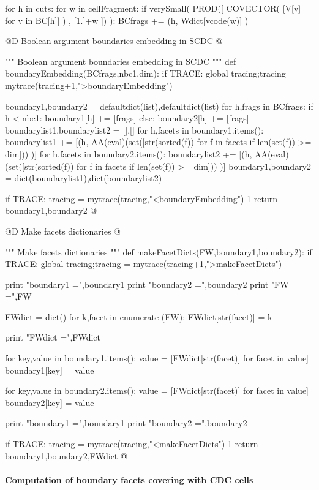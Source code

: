 \documentclass[11pt,oneside]{article}	%
\begin{document}
for h in cuts:
	for w in cellFragment:
		if verySmall( PROD([ COVECTOR( [V[v] for v in BC[h]] ) , [1.]+w ]) ):
			BCfrags += (h, Wdict[vcode(w)] )

@D Boolean argument boundaries embedding in SCDC
@{""" Boolean argument boundaries embedding in SCDC """
def boundaryEmbedding(BCfrags,nbc1,dim):
	if TRACE: global tracing;tracing = mytrace(tracing+1,">boundaryEmbedding")

	boundary1,boundary2 = defaultdict(list),defaultdict(list)						 
	for h,frags in BCfrags:
		if h < nbc1: boundary1[h] += [frags]
		else: boundary2[h] += [frags]	
	boundarylist1,boundarylist2 = [],[]
	for h,facets in boundary1.items():
		boundarylist1 += [(h, AA(eval)(set([str(sorted(f)) 
							for f in facets if len(set(f)) >= dim])) )]
	for h,facets in boundary2.items():
		boundarylist2 += [(h, AA(eval)(set([str(sorted(f)) 
							for f in facets if len(set(f)) >= dim])) )]
	boundary1,boundary2 = dict(boundarylist1),dict(boundarylist2)

	if TRACE: tracing = mytrace(tracing,"<boundaryEmbedding")-1
	return boundary1,boundary2
@}


@D Make facets dictionaries
@{""" Make facets dictionaries """
def makeFacetDicts(FW,boundary1,boundary2):
	if TRACE: global tracing;tracing = mytrace(tracing+1,">makeFacetDicts")
	
	print "boundary1 =",boundary1
	print "boundary2 =",boundary2
	print "FW =",FW
	
	FWdict = dict()
	for k,facet in enumerate (FW): FWdict[str(facet)] = k
	
	print "FWdict =",FWdict

	for key,value in boundary1.items():
		value = [FWdict[str(facet)] for facet in value]
		boundary1[key] = value
		
	for key,value in boundary2.items():
		value = [FWdict[str(facet)] for facet in value]
		boundary2[key] = value

	print "boundary1 =",boundary1
	print "boundary2 =",boundary2

	if TRACE: tracing = mytrace(tracing,"<makeFacetDicts")-1
	return boundary1,boundary2,FWdict
@}


\paragraph{Computation of boundary facets covering with CDC cells}
\end{document}
